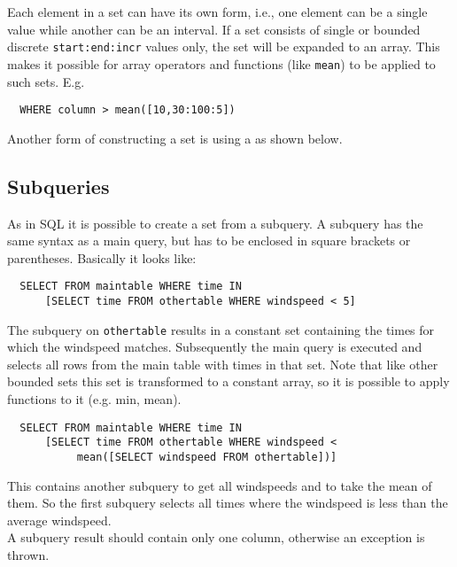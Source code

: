 Each element in a set can have its own form, i.e., one element can
be a single value while another can be an interval.
If a set consists of single or bounded discrete
\texttt{start:end:incr} values only, the set will be expanded to an
array.
This makes it possible for array operators and functions
(like \texttt{mean}) to be applied to such sets. E.g.
\begin{verbatim}
  WHERE column > mean([10,30:100:5])
\end{verbatim}

Another form of constructing a set is using a
 as shown below.

\subsection{\label{TAQL:SUBQUERIES}Subqueries}
As in SQL it is possible to create a set from a subquery. A
subquery has the same syntax as a main query, but has to be
enclosed in square brackets or parentheses. Basically it looks like:
\begin{verbatim}
  SELECT FROM maintable WHERE time IN
      [SELECT time FROM othertable WHERE windspeed < 5]
\end{verbatim}
The subquery on \texttt{othertable} results in a constant set
containing the times
for which the windspeed matches. Subsequently the main query
is executed and selects all rows from the main table with times in
that set.
Note that like other bounded sets this set is transformed to a
constant array, so it is possible to apply functions to it (e.g. min, mean).
\begin{verbatim}
  SELECT FROM maintable WHERE time IN
      [SELECT time FROM othertable WHERE windspeed <
           mean([SELECT windspeed FROM othertable])]
\end{verbatim}
This contains another subquery to get all windspeeds and
to take the mean of them. So the first subquery selects all times
where the windspeed is less than the average windspeed.
\\A subquery result should contain only one column, otherwise
an exception is thrown.

